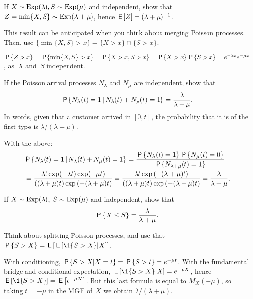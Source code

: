 \documentclass[stochastic-or.tex]{subfiles}
\begin{document}
\begin{exercise}\label{ex:10}
 If  $X\sim\Exp{\lambda}, S\sim\Exp{\mu}$ and
 independent, show that $Z=\min\{X,S\}\sim\Exp{\lambda+\mu}$,
hence $\E Z = (\lambda+\mu)^{-1}$.
\begin{hint}
This result can be anticipated when you think about merging Poisson processes. Then, use
$\{\min\{X, S\}>x\} =\{X>x\} \cap\{S> x\}$.
\end{hint}
\begin{solution}
$\P{Z>x} = \P{\min\{X,S\}>x} = \P{X>x, S> x} = \P{X>x}\P{S>x}  = e^{-\lambda x} e^{-\mu x}$, as~$X$ and~$S$ independent.
\end{solution}
\end{exercise}


\begin{exercise}\label{ex:30a}
 If the Poisson arrival processes $N_\lambda$ and $N_\mu$ are independent, show that
 \begin{equation*}
 \P{N_\lambda(t) = 1 \given N_\lambda(t) + N_\mu(t) = 1} =
\frac{\lambda}{\lambda+\mu}.
 \end{equation*}
In words,  given that a customer arrived in $[0,t]$, the probability that it is of the first type is $\lambda/(\lambda+\mu)$.
\begin{solution}
 With the above:
 \begin{align*}
& \P{N_\lambda(t) = 1 \given N_\lambda(t) + N_\mu(t) = 1}
= \frac{\P{N_\lambda(t) = 1}\P{N_\mu(t) = 0}}{\P{N_{\lambda+\mu}(t) = 1}} \\
&= \frac{\lambda t \exp(-\lambda t) \exp(-\mu t)}{((\lambda+\mu)t)\exp{(-(\lambda+\mu)t)}}
= \frac{\lambda t \exp{(-(\lambda + \mu)t)}}{((\lambda+\mu)t)\exp{(-(\lambda+\mu)t)}}
= \frac{\lambda}{\lambda+\mu}.
 \end{align*}
\end{solution}
\end{exercise}


\begin{exercise}\label{ex:3}
 If
$X\sim \Exp{\lambda}$, $S\sim\Exp{\mu}$  and independent, show that
 \begin{equation*}
 \P{X\leq S} = \frac{\lambda}{\lambda+\mu}.
 \end{equation*}
\begin{hint}
Think about splitting Poisson processes, and use that $\P{S > X} = \E{\E{\1{S>X}|X}}$.
\end{hint}
\begin{solution}
With conditioning, $\P{S>X|X=t} = \P{S>t} =e^{-\mu t}$.
With the fundamental bridge and conditional expectation, $\E{\1{S>X}|X} = e^{-\mu X}$, hence $\E{\1{S>X}} = \E{e^{-\mu X}}$. But this last formula is equal to
$M_{X}(-\mu)$, so taking $t=-\mu$ in the MGF of~$X$ we obtain $\lambda/(\lambda+\mu)$.
\end{solution}
\end{exercise}
\end{document}
